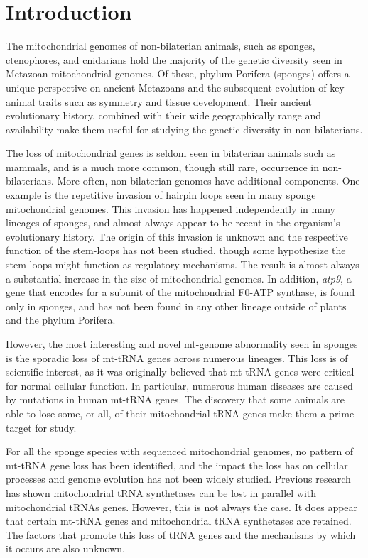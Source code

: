 \documentclass[../main.tex]{subfiles}
\begin{document}
\newpage
\section{Introduction}

The mitochondrial genomes of non-bilaterian animals, such as sponges, ctenophores, and cnidarians hold the majority of the genetic diversity seen in Metazoan mitochondrial genomes. Of these, phylum Porifera (sponges) offers a unique perspective on ancient Metazoans and the subsequent evolution of key animal traits such as symmetry and tissue development. Their ancient evolutionary history, combined with their wide geographically range and availability make them useful for studying the genetic diversity in non-bilaterians. 

The loss of mitochondrial genes is seldom seen in bilaterian animals such as mammals, and is a much more common, though still rare, occurrence in non-bilaterians. More often, non-bilaterian genomes have additional components. One example is the repetitive invasion of hairpin loops seen in many sponge mitochondrial genomes. This invasion has happened independently in many lineages of sponges, and almost always appear to be recent in the organism's evolutionary history. The origin of this invasion is unknown and the respective function of the stem-loops has not been studied, though some hypothesize the stem-loops might function as regulatory mechanisms. The result is almost always a substantial increase in the size of mitochondrial genomes. In addition, \emph{atp9}, a gene that encodes for a subunit of the mitochondrial F0-ATP synthase, is found only in sponges, and has not been found in any other lineage outside of plants and the phylum Porifera. 

However, the most interesting and novel mt-genome abnormality seen in sponges is the sporadic loss of mt-tRNA genes across numerous lineages. This loss is of scientific interest, as it was originally believed that mt-tRNA genes were critical for normal cellular function. In particular, numerous human diseases are caused by mutations in human mt-tRNA genes. The discovery that some animals are able to lose some, or all, of their mitochondrial tRNA genes make them a prime target for study.

For all the sponge species with sequenced mitochondrial genomes, no pattern of mt-tRNA gene loss has been identified, and the impact the loss has on cellular processes and genome evolution has not been widely studied. Previous research has shown mitochondrial tRNA synthetases can be lost in parallel with mitochondrial tRNAs genes. However, this is not always the case. It does appear that certain mt-tRNA genes and mitochondrial tRNA synthetases are retained. The factors that promote this loss of tRNA genes and the mechanisms by which it occurs are also unknown. 
\end{document}

